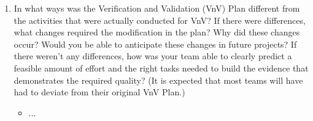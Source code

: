 \documentclass[12pt, titlepage]{article}
\begin{document}
\begin{enumerate}
  \item In what ways was the Verification and Validation (VnV) Plan different
  from the activities that were actually conducted for VnV?  If there were
  differences, what changes required the modification in the plan?  Why did
  these changes occur?  Would you be able to anticipate these changes in future
  projects?  If there weren't any differences, how was your team able to clearly
  predict a feasible amount of effort and the right tasks needed to build the
  evidence that demonstrates the required quality?  (It is expected that most
  teams will have had to deviate from their original VnV Plan.)
  
\begin{itemize}
  \item ...
\end{itemize}
  
\end{enumerate}
\end{document}

